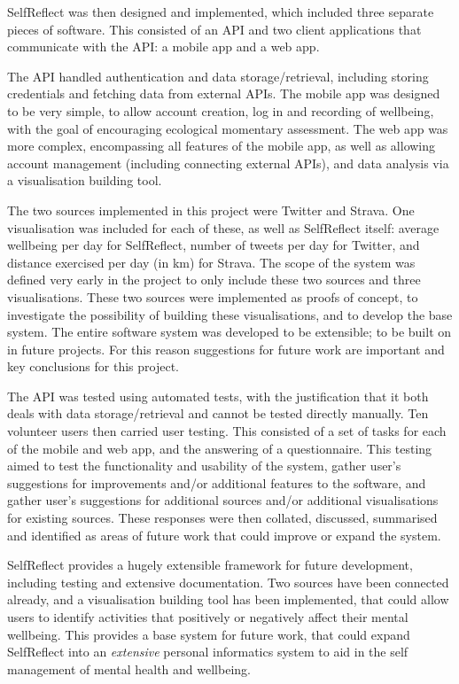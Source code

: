 \documentclass[11pt,openright,a4paper]{report}
\begin{document}
SelfReflect was then designed and implemented, which included three separate pieces of software. This consisted of an API and two client applications that communicate with the API: a mobile app and a web app.

The API handled authentication and data storage/retrieval, including storing credentials and fetching data from external APIs. The mobile app was  designed to be very simple, to allow account creation, log in and recording of wellbeing, with the goal of encouraging ecological momentary assessment. The web app was more complex, encompassing all features of the mobile app, as well as allowing account management (including connecting external APIs), and data analysis via a visualisation building tool.

The two sources implemented in this project were Twitter and Strava. One visualisation was included for each of these, as well as SelfReflect itself: average wellbeing per day for SelfReflect, number of tweets per day for Twitter, and distance exercised per day (in km) for Strava. The scope of the system was defined very early in the project to only include these two sources and three visualisations. These two sources were implemented as proofs of concept, to investigate the possibility of building these visualisations, and to develop the base system. The entire software system was developed to be extensible; to be built on in future projects. For this reason suggestions for future work are important and key conclusions for this project.

The API was tested using automated tests, with the justification that it both deals with data storage/retrieval and cannot be tested directly manually. Ten volunteer users then carried user testing. This consisted of a set of tasks for each of the mobile and web app, and the answering of a questionnaire. This testing aimed to test the functionality and usability of the system, gather user's suggestions for improvements and/or additional features to the software, and gather user's suggestions for additional sources and/or additional visualisations for existing sources. These responses were then collated, discussed, summarised and identified as areas of future work that could improve or expand the system.

SelfReflect provides a hugely extensible framework for future development, including testing and extensive documentation. Two sources have been connected already, and a visualisation building tool has been implemented, that could allow users to identify activities that positively or negatively affect their mental wellbeing. This provides a base system for future work, that could expand SelfReflect into an \emph{extensive} personal informatics system to aid in the self management of mental health and wellbeing.
\end{document}
